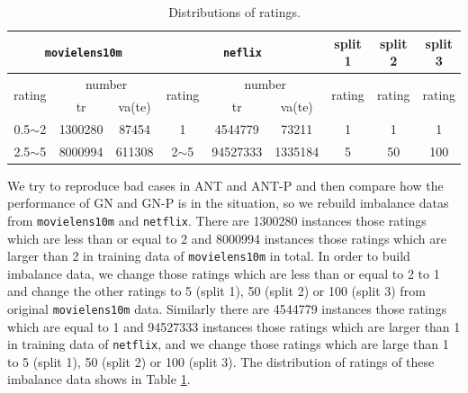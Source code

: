 \documentclass[11pt,twoside]{article}
\begin{document}
\begin{table}[H]
\centering
\begin{tabular}{|c|c|c|c|c|c|c|c|c|l|}
\hline
\multicolumn{3}{|c|}{\tt movielens10m}                    & \multicolumn{3}{c|}{\tt neflix}                           & split 1                 & split 2                 & \multicolumn{2}{c|}{split 3}                 \\ \hline
\multirow{2}{*}{rating} & \multicolumn{2}{c|}{number} & \multirow{2}{*}{rating} & \multicolumn{2}{c|}{number} & \multirow{2}{*}{rating} & \multirow{2}{*}{rating} & \multicolumn{2}{c|}{\multirow{2}{*}{rating}} \\ \cline{2-3} \cline{5-6}
                        & tr            & va(te)          &                         & tr            & va(te)          &                         &                         & \multicolumn{2}{c|}{}                        \\ \hline
0.5$\sim$2              & 1300280       & 87454       & 1                       & 4544779       & 73211       & 1                       & 1                       & \multicolumn{2}{c|}{1}                       \\ \hline
2.5$\sim$5              & 8000994       & 611308      & 2$\sim$5                & 94527333      & 1335184     & 5                       & 50                      & \multicolumn{2}{c|}{100}                     \\ \hline
\end{tabular}
\caption{Distributions of ratings.}
\label{tab:dist}
\end{table}

We try to reproduce bad cases in ANT and ANT-P and then compare how the performance of GN and GN-P is in the situation, so we rebuild imbalance datas from {\tt movielens10m} and {\tt netflix}. There are 1300280 instances those ratings which are less than or equal to 2 and 8000994 instances those ratings which are larger than 2 in training data of {\tt movielens10m} in total. In order to build imbalance data, we change those ratings which are less than or equal to 2 to 1 and change the other ratings to 5 (split 1), 50 (split 2) or 100 (split 3) from original {\tt movielens10m} data. Similarly there are 4544779 instances those ratings which are equal to 1 and 94527333 instances those ratings which are larger than 1 in training data of {\tt netflix}, and we change those ratings which are large than 1 to 5 (split 1), 50 (split 2) or 100 (split 3). The distribution of ratings of these imbalance data shows in Table \ref{tab:dist}.
\end{document}
